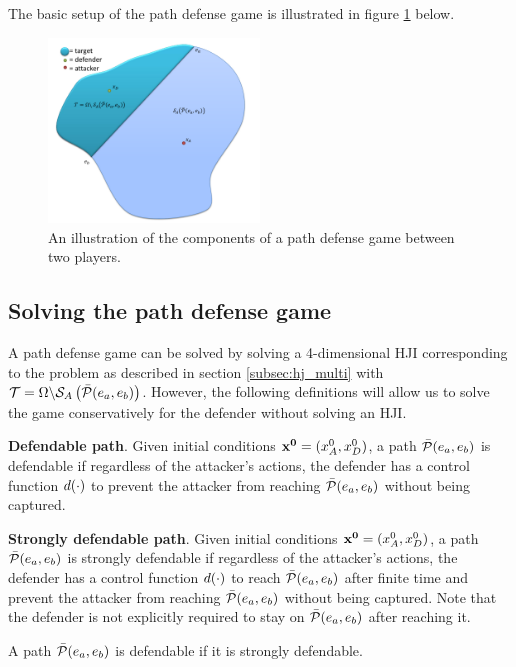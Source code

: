 The basic setup of the path defense game is illustrated in figure \ref{fig:pd_form} below.
\begin{figure}[h]
\centering
\includegraphics[width=0.5\textwidth]{"fig/path defense game"}
\caption{An illustration of the components of a path defense game between two players.}
\label{fig:pd_form}
\end{figure}

\subsection{Solving the path defense game}
A path defense game can be solved by solving a 4-dimensional HJI corresponding to the problem as described in section \ref{subsec:hj_multi} with $\mathcal{T}=\Omega\backslash\mathcal{S}_A\left(\bar{\mathcal{P}}(e_a,e_b)\right)$. However, the following definitions will allow us to solve the game conservatively for the defender without solving an HJI.

\begin{defn} %
\textbf{Defendable path}. Given initial conditions $\mathbf{x^0}=(x_A^0,x_D^0)$, a path $\bar{\mathcal{P}}(e_a,e_b)$ is defendable if regardless of the attacker's actions, the defender has a control function $d(\cdot)$ to prevent the attacker from reaching $\bar{\mathcal{P}}(e_a,e_b)$ without being captured.
\end{defn}

\begin{defn} %
\textbf{Strongly defendable path}. Given initial conditions $\mathbf{x^0}=(x_A^0,x_D^0)$, a path $\bar{\mathcal{P}}(e_a,e_b)$ is strongly defendable if regardless of the attacker's actions, the defender has a control function $d(\cdot)$ to reach $\bar{\mathcal{P}}(e_a,e_b)$ after finite time and prevent the attacker from reaching $\bar{\mathcal{P}}(e_a,e_b)$ without being captured. Note that the defender is not explicitly required to stay on $\bar{\mathcal{P}}(e_a,e_b)$ after reaching it.
\end{defn}

\begin{rem}
A path $\bar{\mathcal{P}}(e_a,e_b)$ is defendable if it is strongly defendable.
\end{rem}

